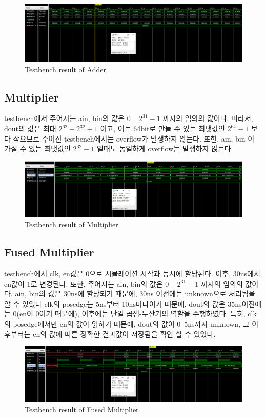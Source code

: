 \documentclass{article}
\begin{document}
\begin{figure}[ht]
	\centering
	\includegraphics[width=1.0\textwidth]{fig/fig1.png}
	\caption{Testbench result of Adder}
\label{fig1}
\end{figure}

\subsection{Multiplier}
testbench에서 주어지는 ain, bin의 값은 0 ~ $2^{31}-1$ 까지의 임의의 값이다.
따라서, dout의 값은 최대 $2^{62}-2^{32}+1$ 이고, 이는 64bit로 만들 수 있는 최댓값인 $2^{64}-1$ 보다 작으므로 주어진 testbench에서는 overflow가 발생하지 않는다.
또한, ain, bin 이 가질 수 있는 최댓값인  $2^{32}-1$ 일때도 동일하게 overflow는 발생하지 않는다. 

\begin{figure}[ht]
	\centering
	\includegraphics[width=1.0\textwidth]{fig/fig2.png}
	\caption{Testbench result of Multiplier}
\label{fig2}
\end{figure}

\subsection{Fused Multiplier}
testbench에서 clk, en값은 0으로 시뮬레이션 시작과 동시에 할당된다. 이후, 30ns에서 en값이 1로 변경된다. 또한, 주어지는 ain, bin의 값은 0 ~ $2^{31}-1$ 까지의 임의의 값이다. ain, bin의 값은 30ns에 할당되기 때문에, 30ns 이전에는 unknown으로 처리됨을 알 수 있었다
clk의 posedge는 5ns부터 10ns마다이기 때문에, dout의 값은 35ns이전에는 0(en이 0이기 때문에), 이후에는 단일 곱셈-누산기의 역할을 수행하였다.
특히, clk의 posedge에서만 en의 값이 읽히기 때문에, dout의 값이 0~5ns까지 unknown, 그 이후부터는 en의 값에 따른 정확한 결과값이 저장됨을 확인 할 수 있었다.

\begin{figure}[ht]
	\centering
	\includegraphics[width=1.0\textwidth]{fig/fig3.png}
	\caption{Testbench result of Fused Multiplier}
\label{fig3}
\end{figure}
\end{document}
